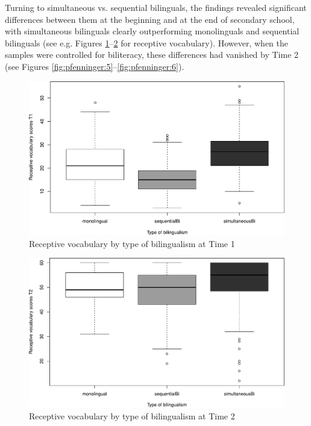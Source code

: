 \documentclass[output=paper,modfonts,nonflat,newtxmath]{langsci/langscibook}
\begin{document}
Turning to simultaneous vs. sequential bilinguals, the findings revealed significant differences between them at the beginning and at the end of secondary school, with simultaneous bilinguals clearly outperforming monolinguals and sequential bilinguals (see e.g. Figures \ref{fig:pfenninger:3}--\ref{fig:pfenninger:4} for receptive vocabulary). However, when the samples were controlled for biliteracy, these differences had vanished by Time 2 (see Figures \ref{fig:pfenninger:5}--\ref{fig:pfenninger:6}).%

\vfill
\begin{figure}[H] %
\includegraphics[width=.75\textwidth]{figures/PfenningerFigure3.pdf}
\caption{\label{fig:pfenninger:3}Receptive vocabulary by type of bilingualism at Time 1}
\end{figure}
\vfill
\pagebreak
\vfill
\begin{figure}[H] %
\includegraphics[width=.75\textwidth]{figures/PfenningerFigure4.pdf}
\caption{\label{fig:pfenninger:4}Receptive vocabulary by type of bilingualism at Time 2}
\end{figure}
\vfill
\end{document}
